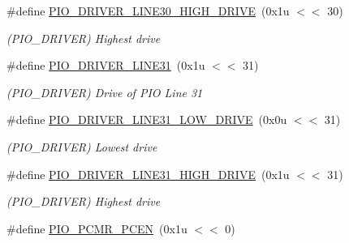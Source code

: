 \begin{DoxyCompactItemize}
\mbox{\label{group__SAMS70__PIO_gab1f1fcab713fb084799f4213dfffbdaa}} 
\#define \mbox{\hyperlink{group__SAMS70__PIO_gab1f1fcab713fb084799f4213dfffbdaa}{P\+I\+O\+\_\+\+D\+R\+I\+V\+E\+R\+\_\+\+L\+I\+N\+E30\+\_\+\+H\+I\+G\+H\+\_\+\+D\+R\+I\+VE}}~(0x1u $<$$<$ 30)
\begin{DoxyCompactList}\small\item\em (P\+I\+O\+\_\+\+D\+R\+I\+V\+ER) Highest drive \end{DoxyCompactList}\item 
\mbox{\label{group__SAMS70__PIO_ga22039ac566e53ad44d64ba417c8c6b60}} 
\#define \mbox{\hyperlink{group__SAMS70__PIO_ga22039ac566e53ad44d64ba417c8c6b60}{P\+I\+O\+\_\+\+D\+R\+I\+V\+E\+R\+\_\+\+L\+I\+N\+E31}}~(0x1u $<$$<$ 31)
\begin{DoxyCompactList}\small\item\em (P\+I\+O\+\_\+\+D\+R\+I\+V\+ER) Drive of P\+IO Line 31 \end{DoxyCompactList}\item 
\mbox{\label{group__SAMS70__PIO_ga0f5d8315c7015643fdf5877319b0c4db}} 
\#define \mbox{\hyperlink{group__SAMS70__PIO_ga0f5d8315c7015643fdf5877319b0c4db}{P\+I\+O\+\_\+\+D\+R\+I\+V\+E\+R\+\_\+\+L\+I\+N\+E31\+\_\+\+L\+O\+W\+\_\+\+D\+R\+I\+VE}}~(0x0u $<$$<$ 31)
\begin{DoxyCompactList}\small\item\em (P\+I\+O\+\_\+\+D\+R\+I\+V\+ER) Lowest drive \end{DoxyCompactList}\item 
\mbox{\label{group__SAMS70__PIO_gaf26b819dcd145ed0e4d8e5cbc60bb22c}} 
\#define \mbox{\hyperlink{group__SAMS70__PIO_gaf26b819dcd145ed0e4d8e5cbc60bb22c}{P\+I\+O\+\_\+\+D\+R\+I\+V\+E\+R\+\_\+\+L\+I\+N\+E31\+\_\+\+H\+I\+G\+H\+\_\+\+D\+R\+I\+VE}}~(0x1u $<$$<$ 31)
\begin{DoxyCompactList}\small\item\em (P\+I\+O\+\_\+\+D\+R\+I\+V\+ER) Highest drive \end{DoxyCompactList}\item 
\mbox{\label{group__SAMS70__PIO_ga71d58c9bab76cc2366b5982453b0957a}} 
\#define \mbox{\hyperlink{group__SAMS70__PIO_ga71d58c9bab76cc2366b5982453b0957a}{P\+I\+O\+\_\+\+P\+C\+M\+R\+\_\+\+P\+C\+EN}}~(0x1u $<$$<$ 0)
$$
\end{DoxyCompactItemize}
